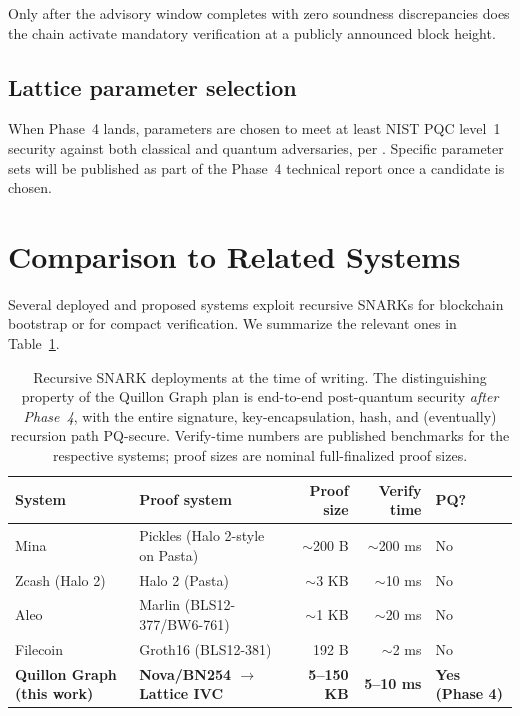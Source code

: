 \documentclass[11pt,a4paper]{article}
\begin{document}
Only after the advisory window completes with zero soundness
discrepancies does the chain activate mandatory verification at a
publicly announced block height.

\subsection{Lattice parameter selection}

When Phase~4 lands, parameters are chosen to meet at least NIST PQC
level~1 security against both classical and quantum adversaries, per
\cite{NISTPQC2022}. Specific parameter sets will be published as
part of the Phase~4 technical report once a candidate is chosen.

\section{Comparison to Related Systems}
\label{sec:comparison}

Several deployed and proposed systems exploit recursive SNARKs for
blockchain bootstrap or for compact verification. We summarize the
relevant ones in Table~\ref{tab:related}.

\begin{table}[h]
\centering
\small
\begin{tabularx}{\linewidth}{l X r r l}
\toprule
\textbf{System} & \textbf{Proof system} & \textbf{Proof size} & \textbf{Verify time} & \textbf{PQ?} \\
\midrule
Mina             & Pickles (Halo 2-style on Pasta)  & $\sim$200 B    & $\sim$200 ms  & No \\
Zcash (Halo 2)   & Halo 2 (Pasta)                   & $\sim$3 KB     & $\sim$10 ms   & No \\
Aleo             & Marlin (BLS12-377/BW6-761)       & $\sim$1 KB     & $\sim$20 ms   & No \\
Filecoin         & Groth16 (BLS12-381)              & 192 B          & $\sim$2 ms    & No \\
\textbf{Quillon Graph (this work)} & \textbf{Nova/BN254 $\to$ Lattice IVC} & \textbf{5--150 KB} & \textbf{5--10 ms} & \textbf{Yes (Phase 4)} \\
\bottomrule
\end{tabularx}
\caption{Recursive SNARK deployments at the time of writing. The
distinguishing property of the Quillon Graph plan is end-to-end
post-quantum security \emph{after Phase~4}, with the entire signature,
key-encapsulation, hash, and (eventually) recursion path PQ-secure.
Verify-time numbers are published benchmarks for the respective systems;
proof sizes are nominal full-finalized proof sizes.}
\label{tab:related}
\end{table}
\end{document}
